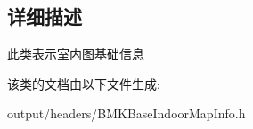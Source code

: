 \subsection{详细描述}
此类表示室内图基础信息 

该类的文档由以下文件生成\+:\begin{DoxyCompactItemize}
\item 
output/headers/B\+M\+K\+Base\+Indoor\+Map\+Info.\+h\end{DoxyCompactItemize}
